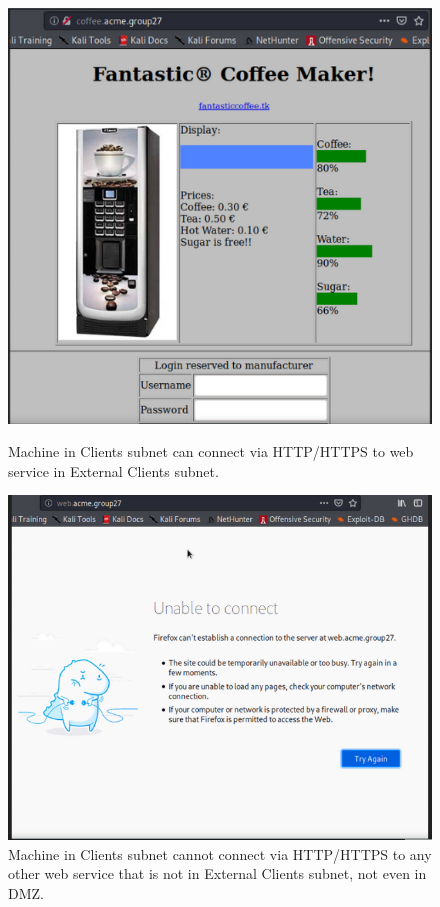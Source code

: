 \begin{figure}[H]
\centering
\begin{minipage}{.5\textwidth}
  \centering
  \includegraphics[width=1\textwidth]{clientCanConnectToHTTPExt.png}
  \caption[a]{Machine in Clients subnet can connect via HTTP/HTTPS to web service in External Clients subnet.}\label{fig:1}
\end{minipage}%
\begin{minipage}{.5\textwidth}
  \centering
  \includegraphics[width=1\textwidth]{clientOtherHTTPDisabled.png}
  \caption[a]{Machine in Clients subnet cannot connect via HTTP/HTTPS to any other web service that is not in External Clients subnet, not even in DMZ.}\label{fig:2}
\end{minipage}
\end{figure}

